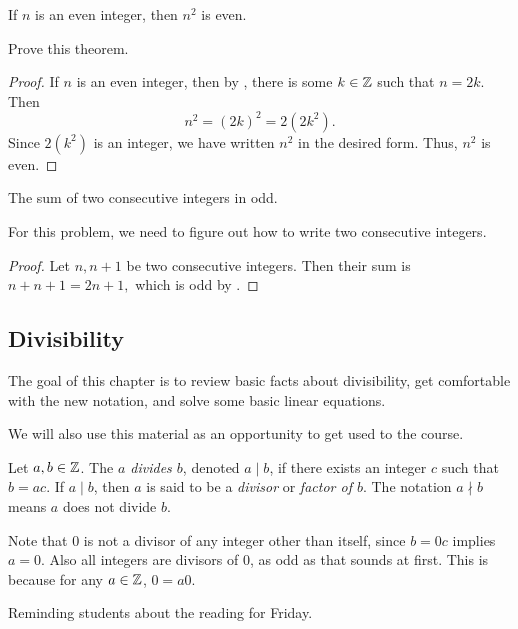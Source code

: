 \documentclass{ximera}
\begin{document}
 
\begin{thm*}\label{thm:even-sq}
If $n$ is an even integer, then $n^2$ is even.
\end{thm*}
\begin{br}\label{br:sqr-evens}
 Prove this theorem.

\begin{proof}
 If $n$ is an even integer, then by , there is some $k\in\mathbb Z$ such that $n=2k$. Then \[n^2=(2k)^2=2(2k^2).\] Since $2(k^2)$ is an integer, we have written $n^2$ in the desired form. Thus, $n^2$ is even.
\end{proof}
\end{br}
 
 \begin{thm*}\label{thm:sum-odd}
The sum of two consecutive integers in odd.
\end{thm*}
For this problem, we need to figure out how to write two consecutive integers. 
\begin{proof}
 Let $n,n+1$ be two consecutive integers. Then their sum is $n+n+1=2n+1,$ which is odd by .
\end{proof}

\subsection{Divisibility}%

The goal of this chapter is to review basic facts about divisibility, get comfortable with the new notation, and solve some basic linear equations.

We will also use this material as an opportunity to get used to the course. 

\begin{defn}[$a$ divides $b$]\label{defn:divides}
 Let $a,b\in \mathbb Z$. The \emph{$a$ divides $b$}, denoted $a\mid b$,  if there exists an integer $c$ such that $b=ac$. If $a\mid b$, then $a$ is said to be a \emph{divisor} or \emph{factor of $b$}. The notation $a\nmid b$ means $a$ does not divide $b$.
\end{defn}

Note that 0 is not a divisor of any integer other than itself, since $b=0c$ implies $a=0$. Also all integers are divisors of 0, as odd as that sounds at first. This is because for any $a\in\mathbb Z$, $0=a0$. 


Reminding students about the reading for Friday.
\end{document}
